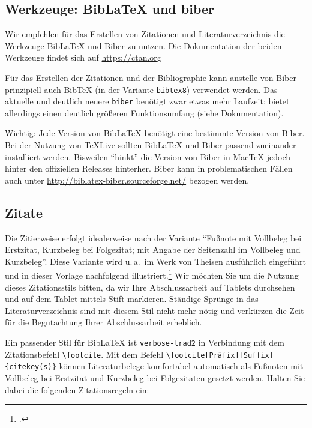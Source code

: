 \subsection{Werkzeuge: BibLaTeX und biber}

Wir empfehlen für das Erstellen von Zitationen und Literaturverzeichnis die Werkzeuge BibLaTeX und Biber zu nutzen.  Die Dokumentation der beiden Werkzeuge findet sich auf \url{https://ctan.org}

Für das Erstellen der Zitationen und der Bibliographie kann anstelle von Biber prinzipiell auch BibTeX (in der Variante \verb|bibtex8|) verwendet werden. Das aktuelle und deutlich neuere \verb|biber| benötigt zwar etwas mehr Laufzeit; bietet allerdings einen deutlich größeren Funktionsumfang (siehe Dokumentation). 

\begin{shaded}
	Wichtig: Jede Version von BibLaTeX benötigt eine bestimmte Version von Biber. Bei der Nutzung von TeXLive sollten BibLaTeX und Biber passend zueinander installiert werden. Bisweilen \enquote{hinkt} die Version von Biber in MacTeX jedoch hinter den offiziellen Releases hinterher.  Biber kann in problematischen Fällen auch unter \url{http://biblatex-biber.sourceforge.net/} bezogen werden.
\end{shaded}







\subsection{Zitate}

Die Zitierweise erfolgt idealerweise nach der Variante \enquote{Fußnote mit Vollbeleg bei Erstzitat, Kurzbeleg bei Folgezitat; mit Angabe der Seitenzahl im Vollbeleg und Kurzbeleg}. Diese Variante wird u.\,a.\ im Werk von Theisen ausführlich eingeführt und in dieser Vorlage nachfolgend illustriert.\footcite[Vgl.][Kap.~7.3]{Theisen2008}
Wir möchten Sie um die Nutzung dieses Zitationsstils bitten, da wir Ihre Abschlussarbeit auf Tablets durchsehen und auf dem Tablet mittels Stift markieren.
Ständige Sprünge in das Literaturverzeichnis sind mit diesem Stil nicht mehr nötig und verkürzen die Zeit für die Begutachtung Ihrer Abschlussarbeit erheblich.

Ein passender Stil für BibLaTeX ist \verb|verbose-trad2| in Verbindung mit dem Zitationsbefehl \verb|\footcite|.
%
Mit dem Befehl \verb|\footcite[Präfix][Suffix]{citekey(s)}| können Literaturbelege komfortabel automatisch als Fußnoten mit Vollbeleg bei Erstzitat und Kurzbeleg bei Folgezitaten gesetzt werden. Halten Sie dabei  die folgenden Zitationsregeln ein:


